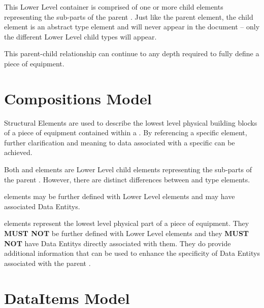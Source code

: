 This \gls{Lower Level}  container is comprised of one or more child  elements representing the sub-parts of the parent . Just like the parent  element, the child  element is an abstract type element and will never appear in the document – only the different \gls{Lower Level} child  types will appear.

This parent-child relationship can continue to any depth required to fully define a piece of equipment.







\section{Compositions Model}
\label{sec:Compositions Model}

 \glspl{Structural Element} are used to describe the lowest level physical building blocks of a piece of equipment contained within a . By referencing a specific  element, further clarification and meaning to data associated with a specific  can be achieved.

Both  and  elements are \gls{Lower Level} child elements representing the sub-parts of the parent .  However, there are distinct differences between  and  type elements.

 elements may be further defined with \gls{Lower Level}  elements and may have associated \glspl{Data Entity}.

 elements represent the lowest level physical part of a piece of equipment.  They \textbf{MUST NOT} be further defined with \gls{Lower Level}  elements and they \textbf{MUST NOT} have \glspl{Data Entity} directly associated with them.   They do provide additional information that can be used to enhance the specificity of \glspl{Data Entity} associated with the parent .





\section{DataItems Model}
\label{sec:DataItems Model}

